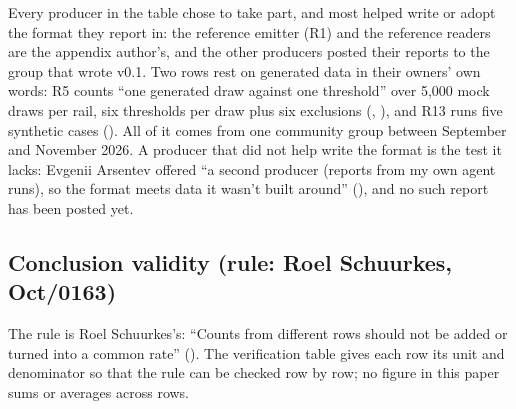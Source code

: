 Every producer in the table chose to take part, and most helped write or adopt the format they report in: the reference emitter (R1) and the reference readers are the appendix author's, and the other producers posted their reports to the group that wrote v0.1. Two rows rest on generated data in their owners' own words: R5 counts ``one generated draw against one threshold'' over 5,000 mock draws per rail, six thresholds per draw plus six exclusions (, ), and R13 runs five synthetic cases (). All of it comes from one community group between September and November 2026. A producer that did not help write the format is the test it lacks: Evgenii Arsentev offered ``a second producer (reports from my own agent runs), so the format meets data it wasn't built around'' (), and no such report has been posted yet.

\subsection{Conclusion validity (rule: Roel Schuurkes, Oct/0163)}

The rule is Roel Schuurkes's: ``Counts from different rows should not be added or turned into a common rate'' (). The verification table gives each row its unit and denominator so that the rule can be checked row by row; no figure in this paper sums or averages across rows.
